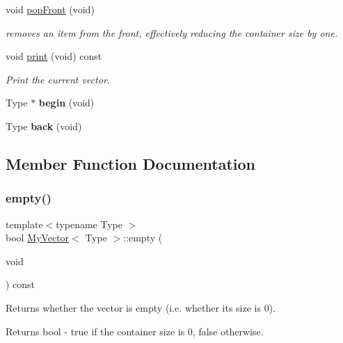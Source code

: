 \begin{DoxyCompactItemize}
void \hyperlink{classMyVector_a38fd78190795c1d26ce5afee7aabcdaa}{pop\+Front} (void)
\begin{DoxyCompactList}\small\item\em removes an item from the front, effectively reducing the container size by one. \end{DoxyCompactList}\item 
\mbox{\label{classMyVector_ad7cc75f5ba4df27bd20a9b6844dcb10e}} 
void \hyperlink{classMyVector_ad7cc75f5ba4df27bd20a9b6844dcb10e}{print} (void) const
\begin{DoxyCompactList}\small\item\em Print the current vector. \end{DoxyCompactList}\item 
\mbox{\label{classMyVector_a0646f68d29b585e684e2a6c539c87854}} 
Type $\ast$ {\bfseries begin} (void)
\item 
\mbox{\label{classMyVector_a903e3c1b014989ed316cc5b39f130bdf}} 
Type {\bfseries back} (void)
\end{DoxyCompactItemize}


\subsection{Member Function Documentation}
\mbox{\label{classMyVector_a9a4db5f7572c6dce12279a8ceb2798d5}} 
\subsubsection{\texorpdfstring{empty()}{empty()}}
{\footnotesize\ttfamily template$<$typename Type $>$ \\
bool \hyperlink{classMyVector}{My\+Vector}$<$ Type $>$\+::empty (\begin{DoxyParamCaption}\item[{void}]{ }\end{DoxyParamCaption}) const}



Returns whether the vector is empty (i.\+e. whether its size is 0). 

\begin{DoxyReturn}{Returns}
bool -\/ true if the container size is 0, false otherwise. 
\end{DoxyReturn}
\mbox{\label{classMyVector_aa4f26bb090c1d23861811ea1983927f1}} 
